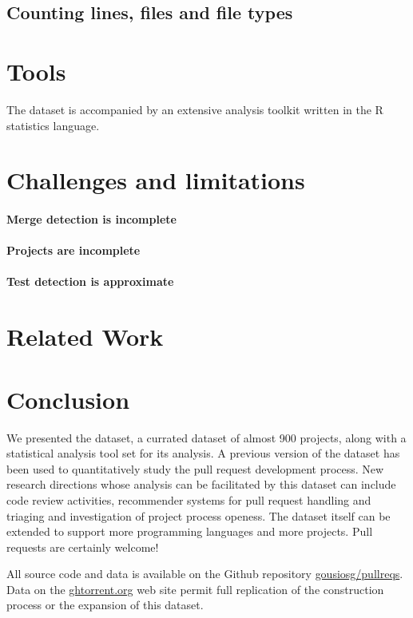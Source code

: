 \documentclass{sig-alternate}
\begin{document}
\subsection{Counting lines, files and file types}


\section{Tools}

The \pullreq dataset is accompanied by an extensive analysis toolkit
written in the R statistics language.

\section{Challenges and limitations}
\label{sec:challenges}

\paragraph*{Merge detection is incomplete}

\paragraph*{Projects are incomplete}

\paragraph*{Test detection is approximate}

\section{Related Work}
\label{sec:rel}


\section{Conclusion}

We presented the \pullreq dataset, a currated dataset of almost 900 projects,
along with a statistical analysis tool set for its analysis. A previous version
of the dataset has been used to quantitatively study the pull request
development process. New research directions whose analysis can be facilitated
by this dataset can include code review activities, recommender systems for pull
request handling and triaging and investigation of project process openess. The
dataset itself can be extended to support more programming languages and more
projects. Pull requests are certainly welcome!

All source code and data is available on the Github repository
\href{https://github.com/gousiosg/pullreqs}{gousiosg/pullreqs}. Data on the
\href{http://ghtorrent.org}{ghtorrent.org} web site permit full replication
of the construction process or the expansion of this dataset.


\balance

  
\end{document}
